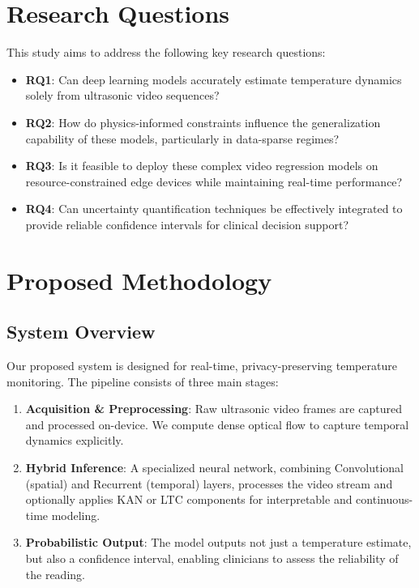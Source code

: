 \documentclass[conference]{IEEEtran}
\begin{document}
\section{Research Questions}
This study aims to address the following key research questions:
\begin{itemize}
    \item \textbf{RQ1}: Can deep learning models accurately estimate temperature dynamics solely from ultrasonic video sequences?
    \item \textbf{RQ2}: How do physics-informed constraints influence the generalization capability of these models, particularly in data-sparse regimes?
    \item \textbf{RQ3}: Is it feasible to deploy these complex video regression models on resource-constrained edge devices while maintaining real-time performance?
    \item \textbf{RQ4}: Can uncertainty quantification techniques be effectively integrated to provide reliable confidence intervals for clinical decision support?
\end{itemize}


\section{Proposed Methodology}

\subsection{System Overview}
Our proposed system is designed for real-time, privacy-preserving temperature monitoring. The pipeline consists of three main stages:
\begin{enumerate}
    \item \textbf{Acquisition \& Preprocessing}: Raw ultrasonic video frames are captured and processed on-device. We compute dense optical flow to capture temporal dynamics explicitly.
    \item \textbf{Hybrid Inference}: A specialized neural network, combining Convolutional (spatial) and Recurrent (temporal) layers, processes the video stream and optionally applies KAN or LTC components for interpretable and continuous-time modeling.
    \item \textbf{Probabilistic Output}: The model outputs not just a temperature estimate, but also a confidence interval, enabling clinicians to assess the reliability of the reading.
\end{enumerate}
\end{document}
